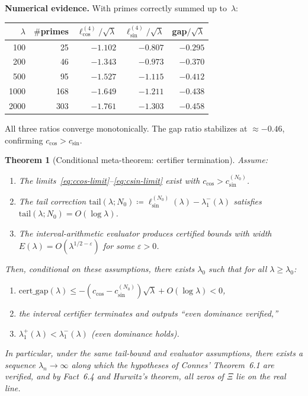 \documentclass[12pt,a4paper]{article}
\newtheorem{theorem}{Theorem}[section]
\theoremstyle{definition}
\theoremstyle{remark}
\begin{document}
\noindent\textbf{Numerical evidence.} With primes correctly summed up to~$\lambda$:

\begin{center}
\renewcommand{\arraystretch}{1.15}
\begin{tabular}{r|r|r|r|r}
$\lambda$ & $\#$primes & $\ell_{\cos}^{(4)}/\sqrt{\lambda}$ & $\ell_{\sin}^{(4)}/\sqrt{\lambda}$ & gap$/\sqrt{\lambda}$ \\\hline
100  & 25  & $-1.102$ & $-0.807$ & $-0.295$ \\
200  & 46  & $-1.343$ & $-0.973$ & $-0.370$ \\
500  & 95  & $-1.527$ & $-1.115$ & $-0.412$ \\
1000 & 168 & $-1.649$ & $-1.211$ & $-0.438$ \\
2000 & 303 & $-1.761$ & $-1.303$ & $-0.458$
\end{tabular}
\end{center}

\noindent All three ratios converge monotonically. The gap ratio stabilizes at $\approx -0.46$, confirming $c_{\cos} > c_{\sin}$.

\begin{theorem}[Conditional meta-theorem: certifier termination]
\label{thm:meta}
Assume:
\begin{enumerate}[label=\textup{(M\arabic*)}]
  \item\label{M1} The limits~\eqref{eq:ccos-limit}--\eqref{eq:csin-limit} exist with $c_{\cos} > c_{\sin}^{(N_0)}$.
  \item\label{M2} The tail correction $\mathrm{tail}(\lambda; N_0) \coloneqq \ell_{\sin}^{(N_0)}(\lambda) - \lambda_1^-(\lambda)$ satisfies $\mathrm{tail}(\lambda; N_0) = O(\log\lambda)$.
  \item\label{M3} The interval-arithmetic evaluator produces certified bounds with width $E(\lambda) = O(\lambda^{1/2-\varepsilon})$ for some $\varepsilon > 0$.
\end{enumerate}
Then, conditional on these assumptions, there exists $\lambda_0$ such that for all $\lambda \geq \lambda_0$:
\begin{enumerate}[label=\textup{(\roman*)}]
  \item $\mathrm{cert\_gap}(\lambda) \leq -(c_{\cos} - c_{\sin}^{(N_0)})\sqrt{\lambda} + O(\log\lambda) < 0$,
  \item the interval certifier terminates and outputs ``even dominance verified,''
  \item $\lambda_1^+(\lambda) < \lambda_1^-(\lambda)$ (even dominance holds).
\end{enumerate}
In particular, under the same tail-bound and evaluator assumptions, there exists a sequence $\lambda_n \to \infty$ along which the hypotheses of Connes' Theorem~6.1 are verified, and by Fact~6.4 and Hurwitz's theorem, all zeros of $\Xi$ lie on the real line.
\end{theorem}
\end{document}
